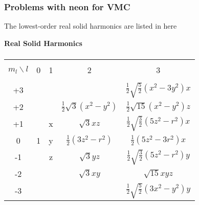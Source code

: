 \documentclass[compress]{beamer}
\begin{document}
\frame
{
  \frametitle{Problems with neon for VMC}
\begin{small}
{\scriptsize
 The lowest-order real solid harmonics are
listed in here
\begin{center} {\large \bf Real Solid Harmonics} \\ 
$\phantom{a}$ \\
\begin{tabular}{ccccc}
\hline\\ 
$m_l\backslash l$ & \phantom{AA}0\phantom{AA}
& \phantom{AA}1\phantom{AA} & \phantom{AA}2\phantom{AA} &
\phantom{AA}3\phantom{AA} \\ 
\hline\\ 
+3& & &
&$\frac{1}{2}\sqrt{\frac{5}{2}}(x^2-3y^2)x$ \\ [7pt] 
+2& & &$\frac{1}{2}\sqrt{3}(x^2-y^2)$&$\frac{1}{2}\sqrt{15}(x^2-y^2)z$
\\ [7pt] 
+1& &x&$\sqrt{3}xz$
&$\frac{1}{2}\sqrt{\frac{3}{2}}(5z^2-r^2)x$ \\ [7pt] 
0&1&y&$\frac{1}{2}(3z^2-r^2)$       &$\frac{1}{2}(5z^2-3r^2)x$ \\
 [7pt] 
-1& &z&$\sqrt{3}yz$
&$\frac{1}{2}\sqrt{\frac{3}{2}}(5z^2-r^2)y$ \\ [7pt] 
-2& & &$\sqrt{3}xy$                  &$\sqrt{15}xyz$ \\ [7pt] 
-3& & &
&$\frac{1}{2}\sqrt{\frac{5}{2}}(3x^2-y^2)y$ \\ [7pt] 
\hline
\end{tabular} 
\end{center}

}
\end{small}
}





\end{document}

